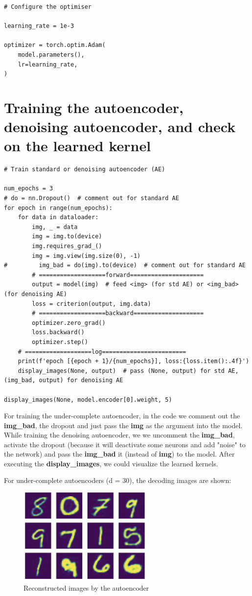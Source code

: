 \begin{verbatim}
# Configure the optimiser

learning_rate = 1e-3

optimizer = torch.optim.Adam(
    model.parameters(),
    lr=learning_rate,
)
\end{verbatim}

\section{Training the autoencoder, denoising autoencoder, and check on the learned kernel}
\begin{verbatim}
# Train standard or denoising autoencoder (AE)

num_epochs = 3
# do = nn.Dropout()  # comment out for standard AE
for epoch in range(num_epochs):
    for data in dataloader:
        img, _ = data
        img = img.to(device)
        img.requires_grad_()
        img = img.view(img.size(0), -1)
#         img_bad = do(img).to(device)  # comment out for standard AE
        # ===================forward=====================
        output = model(img)  # feed <img> (for std AE) or <img_bad> (for denoising AE)
        loss = criterion(output, img.data)
        # ===================backward====================
        optimizer.zero_grad()
        loss.backward()
        optimizer.step()
    # ===================log========================
    print(f'epoch [{epoch + 1}/{num_epochs}], loss:{loss.item():.4f}')
    display_images(None, output)  # pass (None, output) for std AE, (img_bad, output) for denoising AE
    
display_images(None, model.encoder[0].weight, 5)
\end{verbatim}

For training the under-complete autoencoder, in the code we comment out the \textbf{img\_bad}, the dropout and just pass the \textbf{img} as the argument into the model. While training the denoising autoencoder, we we uncomment the \textbf{img\_bad}, activate the dropout (because it will deactivate some neurons and add "noise" to the network) and pass the \textbf{img\_bad} it (instead of \textbf{img}) to the model. After executing the \textbf{display\_images}, we could visualize the learned kernels.

For under-complete autoencoders (d = 30), the decoding images are shown:

\begin{figure}[htb]
    \centering
    \includegraphics[width=0.6\textwidth]{figs/Autoencoder.png}
    \caption{Reconstructed images by the autoencoder}
    \label{fig:Autoencoder}
\end{figure}

